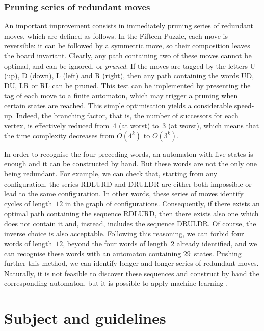 \documentclass[11pt,a4paper]{article}
\begin{document}
\subsubsection{Pruning series of redundant moves}
\label{sec:raf:prune}

An important improvement consists in immediately pruning series of
redundant moves, which are defined as follows. In the Fifteen Puzzle,
each move is reversible: it can be followed by a symmetric move, so
their composition leaves the board invariant. Clearly, any path
containing two of these moves cannot be optimal, and can be ignored,
or \emph{pruned}. If the moves are tagged by the letters U (up), D
(down), L (left) and R (right), then any path containing the words UD,
DU, LR or RL can be pruned. This test can be implemented by presenting
the tag of each move to a finite automaton, which may trigger a
pruning when certain states are reached. This simple optimisation
yields a considerable speed\hyp{}up. Indeed, the branching factor,
that is, the number of successors for each vertex, is effectively
reduced from~\(4\) (at worst) to~\(3\) (at worst), which means that
the time complexity decreases from \(O(4^k)\) to \(O(3^k)\).

In order to recognise the four preceding words, an automaton with five
states is enough and it can be constructed by hand. But these words
are not the only one being redundant. For example, we can check that,
starting from any configuration, the series RDLURD and DRULDR are
either both impossible or lead to the same configuration. In other
words, these series of moves identify cycles of length~\(12\) in the
graph of configurations. Consequently, if there exists an optimal path
containing the sequence RDLURD, then there exists also one which does
not contain it and, instead, includes the sequence DRULDR. Of course,
the inverse choice is also acceptable. Following this reasoning, we
can forbid four words of length~\(12\), beyond the four words of
length~\(2\) already identified, and we can recognise these words with
an automaton containing \(29\)~states. Pushing further this method, we
can identify longer and longer series of redundant moves. Naturally,
it is not feasible to discover these sequences and construct by hand
the corresponding automaton, but it is possible to apply machine
learning \citep{taylor-korf-93}.

\section{Subject and guidelines}
\end{document}
